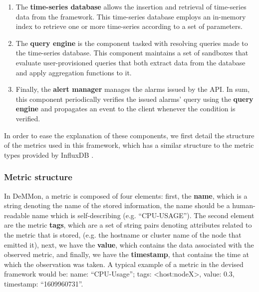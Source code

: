 \begin{enumerate}
    
    \item The \textbf{time-series database} allows the insertion and retrieval of time-series data from the framework. This time-series database employs an in-memory index to retrieve one or more time-series according to a set of parameters.

    \item The \textbf{query engine} is the component tasked with resolving queries made to the time-series database. This component maintains a set of sandboxes that evaluate user-provisioned queries that both extract data from the database and apply aggregation functions to it.
    
    \item Finally, the \textbf{alert manager} manages the alarms issued by the API. In sum, this component periodically verifies the issued alarms' query using the \textbf{query engine} and propagates an event to the client whenever the condition is verified.
     
\end{enumerate}

In order to ease the explanation of these components, we first detail the structure of the metrics used in this framework, which has a similar structure to the metric types provided by InfluxDB \cite{influxdb_data_elements}. 

\subsubsection{Metric  structure}

In DeMMon, a metric is composed of four elements: first, the \textbf{name}, which is a string denoting the name of the stored information, the name should be a human-readable name which is self-describing (e.g. ``CPU-USAGE''). The second element are the metric \textbf{tags}, which are a set of string pairs denoting attributes related to the metric that is stored, (e.g. the hostname or cluster name of the node that emitted it), next, we have the \textbf{value}, which contains the data associated with the observed metric, and finally, we have the  \textbf{timestamp}, that contains the time at which the observation was taken. A typical example of a metric in the devised framework would be: name: ``CPU-Usage''; tags: <host:nodeX>, value: 0.3, timestamp: ``1609960731''.

